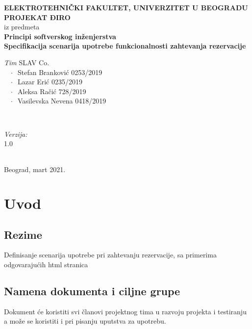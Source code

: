\documentclass[12pt]{article}
\begin{document}
    \renewcommand{\labelenumii}{\arabic{enumi}.\arabic{enumii}}
	\begin{titlepage}  
		\center
		\textbf{ \LARGE ELEKTROTEHNIČKI FAKULTET, UNIVERZITET U BEOGRADU } \\[4cm]
		\textbf{ \Large PROJEKAT ĐIRO\texttrademark} \\[0.3cm]
		iz predmeta \\[0.3cm]
		\textbf{ \Large Principi softverskog inženjerstva} \\[0.7cm]
		{ \huge \bfseries Specifikacija scenarija upotrebe funkcionalnosti zahtevanja rezervacije } \\[6cm]
		

		\begin{minipage}{0.5\textwidth}
			\begin{flushleft}
				\large
				\emph{Tim} SLAV Co. \\
			     $\;\;\; \cdot \;\;$Stefan Branković  0253/2019\\
			     $\;\;\; \cdot \;\;$Lazar Erić 0235/2019\\
			     $\;\;\; \cdot \;\;$Aleksa Račić 728/2019\\
			     $\;\;\; \cdot \;\;$Vasilevska Nevena 0418/2019
			\end{flushleft}
		\end{minipage}
		~
		\begin{minipage}{0.4\textwidth}
			\begin{flushright}
				\large
				\emph{Verzija:} \\
				1.0
			\end{flushright}
		\end{minipage} \\[2cm]
		\enlargethispage{4\baselineskip}
		{ \large Beograd, mart 2021. }
		\vfill
	\end{titlepage}
\pagebreak
\tableofcontents
\pagebreak



\section{Uvod}
\subsection{Rezime}
Definisanje scenarija upotrebe pri zahtevanju rezervacije, sa primerima odgovarajućih html stranica
\subsection{Namena dokumenta i ciljne grupe}
Dokument će koristiti svi članovi projektnog tima u razvoju projekta i testiranju a može se koristiti i pri pisanju uputstva za
upotrebu.
\end{document}
